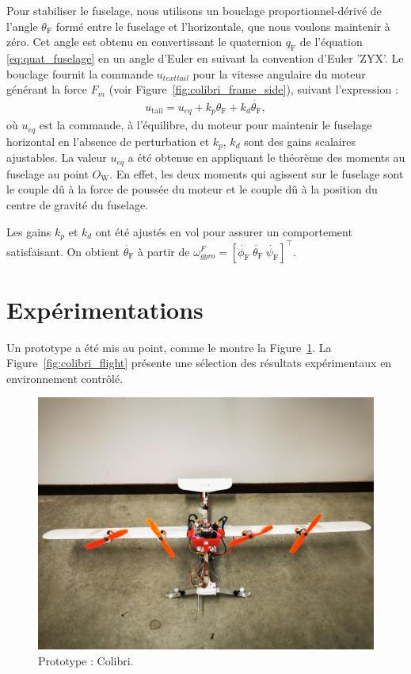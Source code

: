 Pour stabiliser le fuselage, nous utilisons un bouclage proportionnel-dérivé de l'angle $\theta_{\text{F}}$ formé entre le fuselage et l'horizontale, que nous voulons maintenir à zéro. Cet angle est obtenu en convertissant le quaternion $q_{\text{F}}$ de l'équation \eqref{eq:quat_fuselage} en un angle d'Euler en suivant la convention d'Euler 'ZYX'. Le bouclage fournit la commande $u_{text{tail}}$ pour la vitesse angulaire du moteur générant la force $F_{m}$ (voir Figure~\ref{fig:colibri_frame_side}), suivant l'expression :
\begin{align*}
    u_{\text{tail}} = u_{eq} + k_{p} \theta_{\text{F}} + k_{d} \dot{\theta_{\text{F}}},
\end{align*}
où $u_{eq}$ est la commande, à l'équilibre, du moteur pour maintenir le fuselage horizontal en l'absence de perturbation et $k_{p}$, $k_{d}$ sont des gains scalaires ajustables. La valeur $u_{eq}$ a été obtenue en appliquant le théorème des moments au fuselage au point $O_{\text{W}}$. En effet, les deux moments qui agissent sur le fuselage sont le couple dû à la force de poussée du moteur et le couple dû à la position du centre de gravité du fuselage.

Les gains $k_{p}$ et $k_{d}$ ont été ajustés en vol pour assurer un comportement satisfaisant. On obtient $\dot{\theta_{\text{F}}}$ à partir de $\omega_{gyro}^{F} = [\dot{\phi_{\text{F}}}~\dot{\theta_{\text{F}}}~\dot{\psi_{\text{F}}}]^\top$.

\section{Expérimentations}
\label{sec:exp}
Un prototype a été mis au point, comme le montre la Figure~\ref{fig:colibri_real}. La Figure~\ref{fig:colibri_flight} présente une sélection des résultats expérimentaux en environnement contrôlé.


\begin{figure}[ht!]
    \centering
    \includegraphics[trim={0 15cm 0 25cm},clip, width=0.6\columnwidth]{figures/colibri_real.jpg}
    \caption{Prototype : Colibri.}
    \label{fig:colibri_real}
\end{figure}

